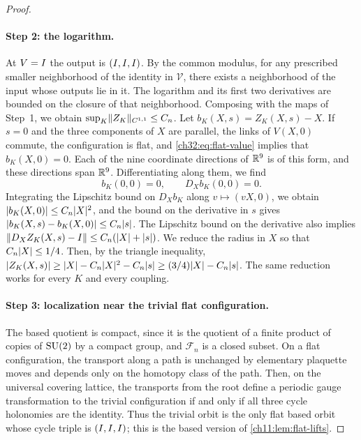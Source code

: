 \begin{proof}
\paragraph{Step 2: the logarithm.}
At $V=I$ the output is $(I,I,I)$. By the common modulus, for any prescribed smaller neighborhood of the identity in $\mathcal V$, there exists a neighborhood of the input whose outputs lie in it. The logarithm and its first two derivatives are bounded on the closure of that neighborhood. Composing with the maps of Step~1, we obtain $\sup_K\lVert Z_K\rVert_{C^{1,1}}\le C_n$. Let $b_K(X,s)=Z_K(X,s)-X$. If $s=0$ and the three components of $X$ are parallel, the links of $V(X,0)$ commute, the configuration is flat, and \eqref{ch32:eq:flat-value} implies that $b_K(X,0)=0$. Each of the nine coordinate directions of $\mathbb R^9$ is of this form, and these directions span $\mathbb R^9$. Differentiating along them, we find
\[
 b_K(0,0)=0,\qquad D_Xb_K(0,0)=0.
\]
Integrating the Lipschitz bound on $D_Xb_K$ along $v\mapsto(vX,0)$, we obtain $\lvert b_K(X,0)\rvert\le C_n\lvert X\rvert^2$, and the bound on the derivative in $s$ gives $\lvert b_K(X,s)-b_K(X,0)\rvert\le C_n\lvert s\rvert$. The Lipschitz bound on the derivative also implies $\lVert D_XZ_K(X,s)-I\rVert\le C_n(\lvert X\rvert+\lvert s\rvert)$. We reduce the radius in $X$ so that $C_n\lvert X\rvert\le1/4$. Then, by the triangle inequality, $\lvert Z_K(X,s)\rvert\ge\lvert X\rvert-C_n\lvert X\rvert^2-C_n\lvert s\rvert\ge(3/4)\lvert X\rvert-C_n\lvert s\rvert$. The same reduction works for every $K$ and every coupling.

\paragraph{Step 3: localization near the trivial flat configuration.}
The based quotient is compact, since it is the quotient of a finite product of copies of $\mathrm{SU}(2)$ by a compact group, and $\mathcal F_n$ is a closed subset. On a flat configuration, the transport along a path is unchanged by elementary plaquette moves and depends only on the homotopy class of the path. Then, on the universal covering lattice, the transports from the root define a periodic gauge transformation to the trivial configuration if and only if all three cycle holonomies are the identity. Thus the trivial orbit is the only flat based orbit whose cycle triple is $(I,I,I)$; this is the based version of \cref{ch11:lem:flat-lifts}.


\end{proof}
